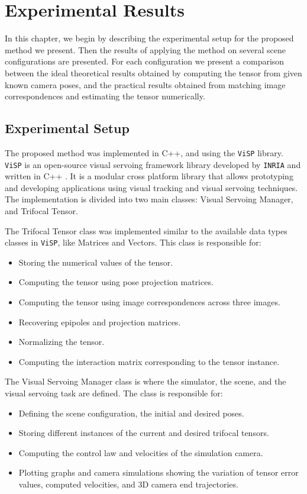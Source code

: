 \chapter{Experimental Results} \label{chap:results}

In this chapter, we begin by describing the experimental setup for the proposed method we present. Then the results of applying the method on several scene configurations are presented. For each configuration we present a comparison between the ideal theoretical results obtained by computing the tensor from given known camera poses, and the practical results obtained from matching image correspondences and estimating the tensor numerically.

\section{Experimental Setup}
The proposed method was implemented in C++, and using the \texttt{ViSP} library. \texttt{ViSP} is an open-source visual servoing framework library developed by \texttt{INRIA} and written in C++ \cite{visp}. It is a modular cross platform library that allows prototyping and developing applications using visual tracking and visual servoing techniques. The implementation is divided into two main classes: Visual Servoing Manager, and Trifocal Tensor.

The Trifocal Tensor class was implemented similar to the available data types classes in \texttt{ViSP}, like Matrices and Vectors. This class is responsible for:
\begin{itemize}
  \item Storing the numerical values of the tensor.
  \item Computing the tensor using pose projection matrices.
  \item Computing the tensor using image correspondences across three images.
  \item Recovering epipoles and projection matrices.
  \item Normalizing the tensor.
  \item Computing the interaction matrix corresponding to the tensor instance.
\end{itemize}

The Visual Servoing Manager class is where the simulator, the scene, and the visual servoing task are defined. The class is responsible for:
\begin{itemize}
  \item Defining the scene configuration, the initial and desired poses.
  \item Storing different instances of the current and desired trifocal tensors.
  \item Computing the control law and velocities of the simulation camera.
  \item Plotting graphs and camera simulations showing the variation of tensor error values, computed velocities, and 3D camera end trajectories.
\end{itemize}

